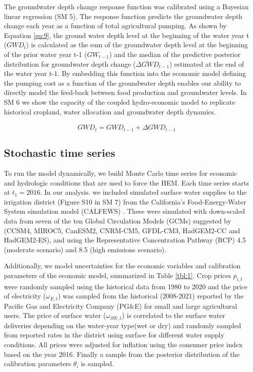 \documentclass[a4paper,fleqn]{cas-sc}
\begin{document}
The groundwater depth change response function was calibrated using a Bayesian linear regression (SM 5). The response function predicts the groundwater depth change each year as a function of total agricultural pumping. As shown by Equation \ref{eq:9}, the ground water depth level at the beginning of the water year t ($GWD_{t}$) is calculated as the sum of the groundwater depth level at the beginning of the prior water year t-1 ($GW_{t-1}$)  and the median of the predictive posterior distribution for groundwater depth change ($\overline{\Delta GWD}_{t-1}$) estimated at the end of the water year t-1. By embedding this function into the economic model defining the pumping cost as a function of the groundwater depth enables our ability to directly model the feed-back between food production and groundwater levels. In SM 6 we show the capacity of the coupled hydro-economic model to replicate historical cropland, water allocation and groundwater depth dynamics.

\begin{equation}
\label{eq:9}
GWD_{t} = GWD_{t-1} + \overline{\Delta GWD}_{t-1}
\end{equation}

\subsection{Stochastic time series}\label{sct:2.2}

To run the model dynamically, we build Monte Carlo time series for economic and hydrologic conditions that are used to force the HEM. Each time series starts at $t_{1}=2016$. In our analysis. we included simulated surface water supplies to the irrigation district (Figure S10 in SM 7) from the California’s Food-Energy-Water System simulation model (CALFEWS) \citep{zeff_californias_2021}. These were simulated with down-scaled data from seven of the ten Global Circulation Models (GCMs) suggested by \citet{pierce_climate_2018} (CCSM4, MIROC5, CanESM2, CNRM-CM5, GFDL-CM3, HadGEM2-CC and HadGEM2-ES), and using the Representative Concentration Pathway (RCP) 4.5 (moderate scenario) and 8.5 (high emissions scenario). 

Additionally, we model uncertainties for the economic variables and calibration parameters of the economic model, summarized in Table \ref{tbl:1}. Crop prices $p_{i,t}$ were randomly sampled using the historical data from 1980 to 2020 \citep{usda_national_2020} and the price of electricity ($\omega_{E,t}$) was sampled from the historical (2008-2021) reported by the Pacific Gas and Electricity Company (PG\&E) for small and large agricultural users. The price of surface water ($\omega_{SW,t}$) is correlated to the surface water deliveries depending on the water-year type(wet or dry) and randomly sampled from reported rates in the district using surface for different water supply conditions. All prices were adjusted for inflation using the consumer price index based on the year 2016. Finally a sample from the posterior distribution of the calibration parameters $\theta_{i}$ is sampled.
\end{document}
